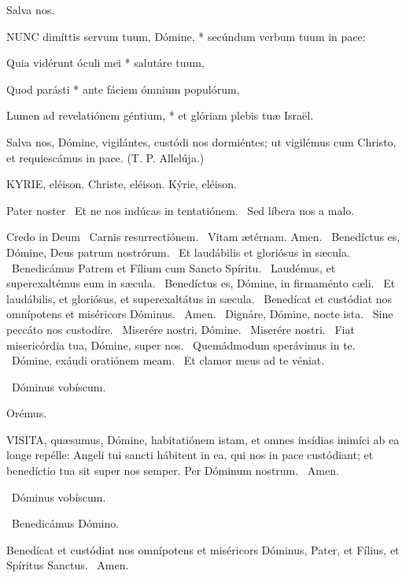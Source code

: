  Salva nos.


\lettrine[lines=2]{N}{UNC} dimíttis servum tuum, Dómine, * secúndum verbum tuum in pace:

Quia vidérunt óculi mei * salutáre tuum,

Quod parásti * ante fáciem ómnium populórum,

Lumen ad revelatiónem géntium, * et glóriam plebis tuæ Israël.

 Salva nos, Dómine, vigilántes, custódi nos dormiéntes; ut vigilémus cum Christo, et requiescámus in pace. (T. P. Allelúja.)


KYRIE, eléison. Christe, eléison. Kýrie, eléison.

Pater noster  \V\ Et ne nos indúcas in tentatiónem. \R\ Sed líbera nos a malo.

Credo in Deum  \V\ Carnis resurrectiónem. \R\ Vitam ætérnam. Amen. \V\ Benedíctus es, Dómine, Deus patrum nostrórum. \R\ Et laudábilis et gloriósus in sæcula. \V\ Benedicámus Patrem et Fílium cum Sancto Spíritu. \R\ Laudémus, et superexaltémus eum in sæcula. \V\ Benedíctus es, Dómine, in firmaménto cæli. \R\ Et laudábilis, et gloriósus, et superexaltátus in sæcula. \V\ Benedícat et custódiat nos omnípotens et miséricors Dóminus. \R\ Amen. \V\ Dignáre, Dómine, nocte ista. \R\ Sine peccáto nos custodíre. \V\ Miserére nostri, Dómine. \R\ Miserére nostri. \V\ Fiat misericórdia tua, Dómine, super nos. \R\ Quemádmodum sperávimus in te. \V\ Dómine, exáudi oratiónem meam. \R\ Et clamor meus ad te véniat.

\sectionornament

\V\ Dóminus vobíscum.

Orémus. 

\lettrine[lines=2]{V}{ISITA}, quæsumus, Dómine, habitatiónem istam, et omnes insídias inimíci ab ea longe repélle: Angeli tui sancti hábitent in ea, qui nos in pace custódiant; et benedíctio tua sit super nos semper. Per Dóminum nostrum. \R\ Amen.

\V\ Dóminus vobíscum.

\V\ Benedicámus Dómino.

 Benedícat et custódiat nos omnípotens et miséricors Dóminus, Pater, et Fílius, et Spíritus Sanctus. \R\ Amen.

